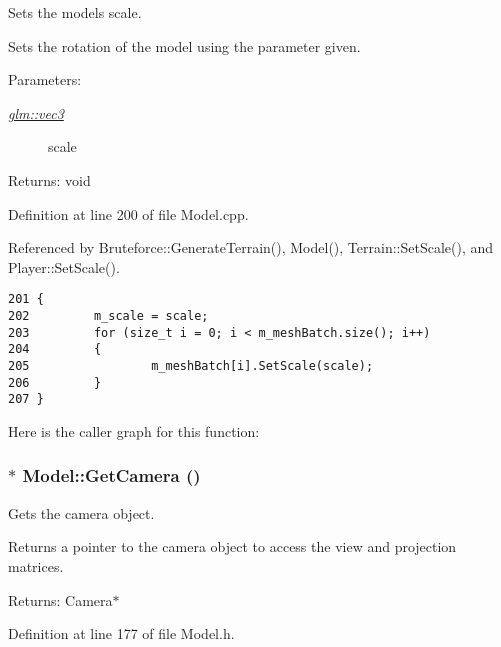 Sets the models scale. 

Sets the rotation of the model using the parameter given.

\begin{Desc}
\item[Parameters:]
\begin{description}
\item[{\em \hyperlink{group__core__types_g1c47e8b3386109bc992b6c48e91b0be7}{glm::vec3}}]scale \end{description}
\end{Desc}
\begin{Desc}
\item[Returns:]void \end{Desc}


Definition at line 200 of file Model.cpp.

Referenced by Bruteforce::GenerateTerrain(), Model(), Terrain::SetScale(), and Player::SetScale().

\begin{Code}\begin{verbatim}201 {
202         m_scale = scale;
203         for (size_t i = 0; i < m_meshBatch.size(); i++)
204         {
205                 m_meshBatch[i].SetScale(scale);
206         }
207 }
\end{verbatim}
\end{Code}




Here is the caller graph for this function:\hypertarget{class_model_8c6429a35a1376657357e6e770470f13}{
\subsubsection[GetCamera]{$\ast$ Model::GetCamera ()}}
\label{class_model_8c6429a35a1376657357e6e770470f13}


Gets the camera object. 

Returns a pointer to the camera object to access the view and projection matrices.

\begin{Desc}
\item[Returns:]Camera$\ast$ \end{Desc}


Definition at line 177 of file Model.h.

